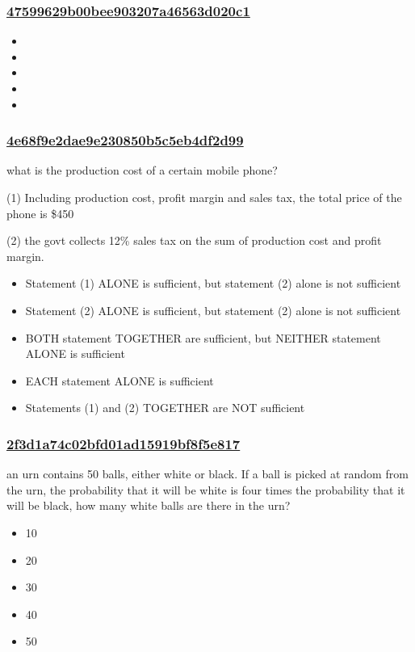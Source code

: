 \documentclass[]{beamer}
\begin{document}
\begin{frame}
    \frametitle{\underline{47599629b00bee903207a46563d020c1}}
        
    \begin{itemize}
        \item
            
        \item
            
        \item
            
        \item
            
        \item
            
    \end{itemize}
\end{frame}
\begin{frame}
    \frametitle{\underline{4e68f9e2dae9e230850b5c5eb4df2d99}}
    what is the production cost of a certain mobile phone?\par
(1) Including production cost, profit margin and sales tax, the total price of the phone is \$450\par
(2) the govt collects 12\% sales tax on the sum of production cost and profit margin.     
    \begin{itemize}
        \item
            Statement (1) ALONE is sufficient, but statement (2) alone is not sufficient
        \item
            Statement (2) ALONE is sufficient, but statement (2) alone is not sufficient
        \item
            BOTH statement TOGETHER are sufficient, but NEITHER statement ALONE is sufficient
        \item
            EACH statement ALONE is sufficient
        \item
            Statements (1) and (2) TOGETHER are NOT sufficient
    \end{itemize}
\end{frame}
\begin{frame}
    \frametitle{\underline{2f3d1a74c02bfd01ad15919bf8f5e817}}
    an urn contains 50 balls, either white or black. If a ball is picked at random from the urn, the probability that it will be white is four times the probability that it will be black, how many white balls are there in the urn?    
    \begin{itemize}
        \item
            10
        \item
            20
        \item
            30
        \item
            40
        \item
            50
    \end{itemize}
\end{frame}
\end{document}
